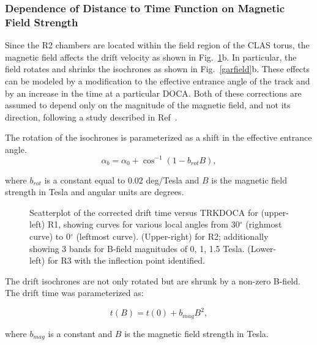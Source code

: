 \subsubsection{Dependence of Distance to Time Function on Magnetic Field Strength}
Since the R2 chambers are located within the field region of the CLAS torus, the 
magnetic field affects the drift velocity as shown in 
Fig.~\ref{xvst}b.  In particular, the field rotates and shrinks the isochrones
as shown in Fig.~\ref{garfield}b.  These effects can be modeled by a 
modification to the effective entrance angle of the track and by an increase 
in the time at a particular DOCA.  Both of these corrections are assumed to depend only on the 
magnitude of the magnetic field, and not its direction, following a study 
described in Ref~\cite{MM-IEEE}.  

The rotation of the isochrones is parameterized as a shift in the effective
entrance angle.  
\begin{equation} 
\label{eq-bcorrn-to-ang}
\alpha_b = \alpha_0 + \cos^{-1}(1 - b_{rot} B), 
\end{equation}

where $b_{rot}$ is a constant equal to $0.02$ deg/Tesla and $B$ is the magnetic field strength in Tesla and angular
units are degrees.

\begin{figure}[htb]
\vspace{15.cm} 
\caption{\small{Scatterplot of the corrected drift time versus TRKDOCA for 
(upper-left) R1, showing curves for various local angles from 30$^{\circ}$
(righmost curve) to 0$^{\circ}$ (leftmost curve).  (Upper-right) for R2; 
additionally showing 3 bands for B-field magnitudes of 0, 1, 1.5 Tesla.
(Lower-left) for R3 with the inflection point identified.}}
\label{xvst}
\end{figure}



The drift isochrones are not only rotated but are shrunk by a non-zero B-field.
The drift time was parameterized as:

\begin{equation} 
\label{eq-bmax}
t(B) = t(0) + b_{mag} B^2,
\end{equation}

\noindent
where $b_{mag}$ is a constant and $B$ is the magnetic field strength in Tesla.


